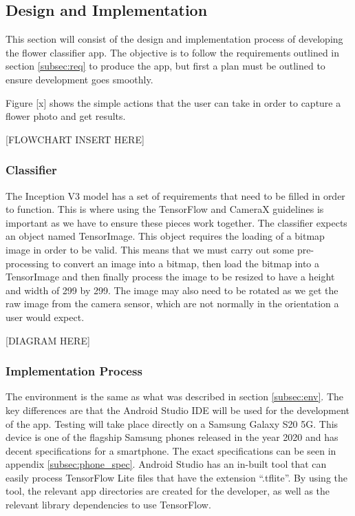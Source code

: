 \documentclass{article}
\begin{document}
\par

\subsection{Design and Implementation}

This section will consist of the design and implementation process of developing the flower classifier app. 
The objective is to follow the requirements outlined in section \ref{subsec:req} to produce the app, but first a plan 
must be outlined to ensure development goes smoothly.

\par

Figure [x] shows the simple actions that the user can take in order to capture a flower photo and get results. 

[FLOWCHART INSERT HERE]

\par

\subsubsection{Classifier}

The Inception V3 model has a set of requirements that need to be filled in order to function. This is where using the 
TensorFlow and CameraX guidelines is important as we have to ensure these pieces work together. The classifier expects 
an object named TensorImage. This object requires the loading of a bitmap image in order to be valid. This means that we
must carry out some pre-processing to convert an image into a bitmap, then load the bitmap into a TensorImage and then 
finally process the image to be resized to have a height and width of 299 by 299.  The image may also need to be rotated
as we get the raw image from the camera sensor, which are not normally in the orientation a user would expect. 

[DIAGRAM HERE]

\subsubsection{Implementation Process}

The environment is the same as what was described in section \ref{subsec:env}. The key differences are that the Android 
Studio IDE will be used for the development of the app. Testing will take place directly on a Samsung Galaxy S20 5G. 
This device is one of the flagship Samsung phones released in the year 2020 and has decent specifications for a 
smartphone. The exact specifications can be seen in appendix \ref{subsec:phone_spec}. Android Studio has an in-built 
tool that can easily process TensorFlow Lite files that have the extension “.tflite”. By using the tool, the relevant 
app directories are created for the developer, as well as the relevant library dependencies to use TensorFlow.
\end{document}
